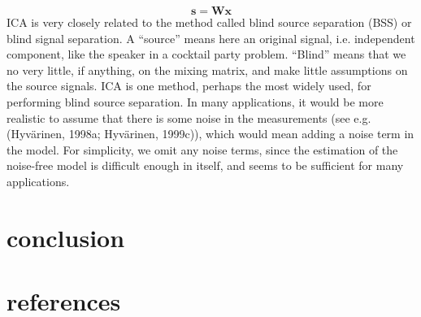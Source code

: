 \documentclass[12pt, a4paper, onecolumn]{IEEEtran}
\begin{document}
\begin{equation}
    \mathbf{s=Wx}
\end{equation}
ICA is very closely related to the method called blind source separation (BSS) or blind signal separation. A “source” means here an original signal, i.e. independent component, like the speaker in a cocktail party problem. “Blind” means that we no very little, if anything, on the mixing matrix, and make little assumptions on the source signals. ICA is one method, perhaps the most widely used, for performing blind source separation.
In many applications, it would be more realistic to assume that there is some noise in the measurements (see e.g. (Hyvärinen, 1998a; Hyvärinen, 1999c)), which would mean adding a noise term in the model. For simplicity, we omit any noise terms, since the estimation of the noise-free model is difficult enough in itself, and seems to be sufficient for many applications.
\section{conclusion}
\section{references}
\end{document}
